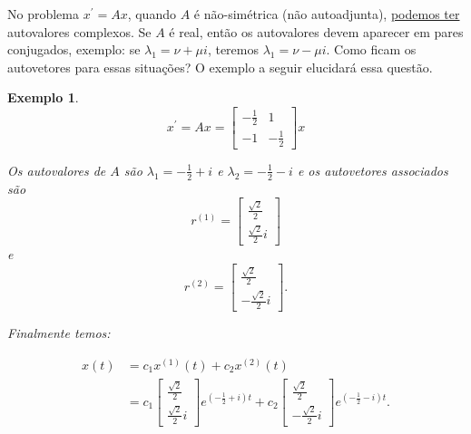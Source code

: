 \documentclass[a4paper,portuguese,9pt,final]{extarticle}
\newtheorem{example}{Exemplo}[section]
\begin{document}
\begin{multicols*}{2}
            No problema $x^\prime = Ax$, quando $A$ é não-simétrica (não autoadjunta), \underline{podemos ter}  autovalores complexos. Se $A$ é real, então os autovalores devem aparecer em pares conjugados, exemplo: se $\lambda_1 = \nu + \mu i$, teremos $\lambda_1 = \nu - \mu i$. Como ficam os autovetores para essas situações? O exemplo a seguir elucidará essa questão.
            
            \begin{example}
            
                \begin{equation*}
                      x^\prime = Ax = \begin{bmatrix}
                                     -\frac{1}{2} & 1\\
                                     -1& -\frac{1}{2}
                                     \end{bmatrix} x 
                    \end{equation*}    
                
                 Os autovalores de $A$ são $\lambda_1 = -\frac{1}{2}+i$ e $\lambda_2 = -\frac{1}{2}-i$ e os autovetores associados são 
                $$r^{(1)} = \begin{bmatrix} \frac{\sqrt{2}}{2}\\ \frac{\sqrt{2}}{2}i \end{bmatrix}$$ e  $$r^{(2)} = \begin{bmatrix} \frac{\sqrt{2}}{2}\\ -\frac{\sqrt{2}}{2}i \end{bmatrix}.$$ 
                
                Finalmente temos:
                
                \begin{equation*}
                    \begin{split}
                        x(t) &= c_1 x^{(1)}(t) + c_2 x^{(2)}(t)  \\
                        &=c_1 \begin{bmatrix} \frac{\sqrt{2}}{2}\\ \frac{\sqrt{2}}{2}i \end{bmatrix}e^{(-\frac{1}{2}+i)t} + c_2 \begin{bmatrix} \frac{\sqrt{2}}{2}\\ -\frac{\sqrt{2}}{2}i \end{bmatrix} e^{(-\frac{1}{2}-i)t}.    
                    \end{split}
                  \end{equation*}
                

\end{example}
\end{multicols*}
\end{document}
